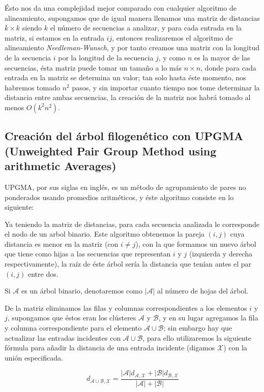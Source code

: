\documentclass[12pt]{article}
\begin{document}
Ésto nos da una complejidad mejor comparado con cualquier algoritmo de alineamiento, supongamos que de igual manera llenamos una matriz de distancias $k\times k$ siendo $k$ el número de secuencias a analizar, y para cada entrada en la matriz, si estamos en la entrada $ij$, entonces realizaremos el algoritmo de alineamiento \textit{Needleman-Wunsch}, y por tanto creamos una matriz con la longitud de la secuencia $i$ por la longitud de la secuencia $j$, y como $n$ es la mayor de las secuencias, ésta matriz puede tomar un tamaño a lo más $n\times n$, donde para cada entrada en la matriz se determina un valor; tan solo hasta éste momento, nos habremos tomado $n^2$ pasos, y sin importar cuanto tiempo nos tome determinar la distancia entre ambas secuencias, la creación de la matriz nos habrá tomado al menos $O(k^2n^2)$.

\subsection{Creación del árbol filogenético con UPGMA\\ (Unweighted Pair Group Method using arithmetic Averages)}

\noindent UPGMA, por sus siglas en inglés, es un método de agrupamiento de pares no ponderados usando promedios aritméticos, y éste algoritmo consiste en lo siguiente:

Ya teniendo la matriz de distancias, para cada secuencia analizada le corresponde el nodo de un arbol binario. Este algoritmo obtenemos la pareja $(i,j)$ cuya distancia es menor en la matriz (con $i\neq j$), con la que formamos un nuevo árbol que tiene como hijas a las secuencias que representan $i$ y $j$ (izquierda y derecha respectivamente), la raíz de éste árbol sería la distancia que tenían antes el par $(i,j)$ entre dos.

Si $\mathcal{A}$ es un árbol binario, denotaremos como $|\mathcal{A}|$ al número de hojas del árbol.

De la matriz eliminamos las filas y columnas correspondientes a los elementos $i$ y $j$, supongamos que éstos eran los clústeres $\mathcal{A}$ y $\mathcal{B}$, y en su lugar agregamos la fila y columna correspondiente para el elemento $\mathcal{A}\cup\mathcal{B}$; sin embargo hay que actualizar las entradas incidentes con $\mathcal{A}\cup\mathcal{B}$, para ello utilizaremos la siguiente fórmula para añadir la distancia de una entrada incidente (digamos $\mathcal{X}$) con la unión especificada.

\[d_{\mathcal{A}\cup\mathcal{B},\mathcal{X}}=\frac{|\mathcal{A}|d_{\mathcal{A},\mathcal{X}}+|\mathcal{B}|d_{\mathcal{B},\mathcal{X}}}{|\mathcal{A}|+|\mathcal{B}|}\]
\end{document}
